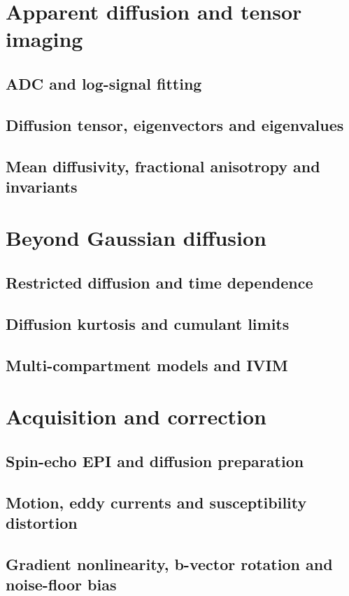 \section{Apparent diffusion and tensor imaging}
\label{sec:10:apparent-diffusion-and-tensor-imaging}
\subsection{ADC and log-signal fitting}
\subsection{Diffusion tensor, eigenvectors and eigenvalues}
\subsection{Mean diffusivity, fractional anisotropy and invariants}

\section{Beyond Gaussian diffusion}
\label{sec:10:beyond-gaussian-diffusion}
\subsection{Restricted diffusion and time dependence}
\subsection{Diffusion kurtosis and cumulant limits}
\subsection{Multi-compartment models and IVIM}

\section{Acquisition and correction}
\label{sec:10:acquisition-and-correction}
\subsection{Spin-echo EPI and diffusion preparation}
\subsection{Motion, eddy currents and susceptibility distortion}
\subsection{Gradient nonlinearity, b-vector rotation and noise-floor bias}

